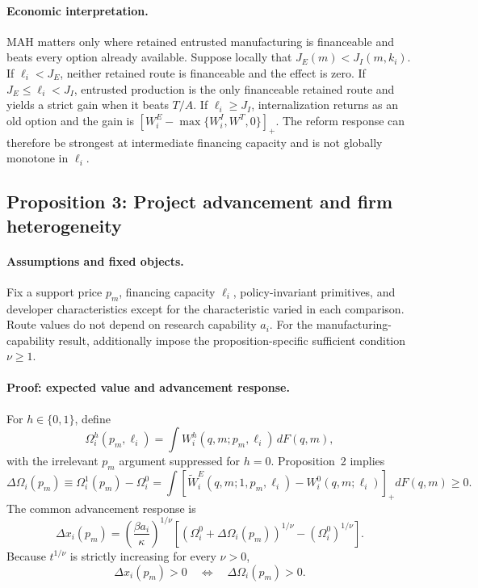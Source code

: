 \paragraph{Economic interpretation.}
MAH matters only where retained entrusted manufacturing is financeable and
beats every option already available. Suppose locally that
\(J_E(m)<J_I(m,k_i)\). If \(\ell_i<J_E\), neither retained route is
financeable and the effect is zero. If
\(J_E\leq\ell_i<J_I\), entrusted production is the only financeable retained
route and yields a strict gain when it beats \(T/A\). If
\(\ell_i\geq J_I\), internalization returns as an old option and the gain is
\([W_i^E-\max\{W_i^I,W^T,0\}]_+\). The reform response can therefore be
strongest at intermediate financing capacity and is not globally monotone in
\(\ell_i\).

\subsection{Proposition 3: Project advancement and firm heterogeneity}
\label{prop:p08-advancement}

\paragraph{Assumptions and fixed objects.}
Fix a support price \(p_m\), financing capacity \(\ell_i\),
policy-invariant primitives, and developer characteristics except for the
characteristic varied in each comparison.
Route values do not depend on research capability \(a_i\). For the
manufacturing-capability result, additionally impose the proposition-specific
sufficient condition \(\nu\geq1\).

\paragraph{Proof: expected value and advancement response.}
For \(h\in\{0,1\}\), define
\begin{equation}
  \Omega_i^h(p_m,\ell_i)
  =
  \int W_i^h(q,m;p_m,\ell_i)\,dF(q,m),
  \label{eq:p08-regime-expected-value}
\end{equation}
with the irrelevant \(p_m\) argument suppressed for \(h=0\).
Proposition~2 implies
\begin{equation}
  \Delta\Omega_i(p_m)
  \equiv
  \Omega_i^1(p_m)-\Omega_i^0
  =
  \int
  \left[\widetilde W_i^E(q,m;1,p_m,\ell_i)
  -W_i^0(q,m;\ell_i)\right]_+
  dF(q,m)
  \geq0.
  \label{eq:p08-expected-gain}
\end{equation}
The common advancement response is
\begin{equation}
  \Delta x_i(p_m)
  =
  \left(\frac{\beta a_i}{\kappa}\right)^{1/\nu}
  \left[
    \left(\Omega_i^0+\Delta\Omega_i(p_m)\right)^{1/\nu}
    -
    \left(\Omega_i^0\right)^{1/\nu}
  \right].
  \label{eq:p08-advancement-change}
\end{equation}
Because \(t^{1/\nu}\) is strictly increasing for every \(\nu>0\),
\[
  \Delta x_i(p_m)>0
  \quad\Longleftrightarrow\quad
  \Delta\Omega_i(p_m)>0.
\]

